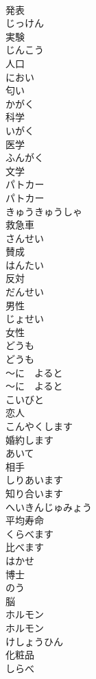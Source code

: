\documentclass[8pt]{extreport}
\begin{document}
\begin{CJK}{UTF8}{min}
\\	発表	
\\	じっけん	
\\	実験	
\\	じんこう	
\\	人口	
\\	におい	
\\	匂い	
\\	かがく	
\\	科学	
\\	いがく	
\\	医学		
\\	ふんがく	
\\	文学		
\\	パトカー	
\\	パトカー	
\\	きゅうきゅうしゃ	
\\	救急車	
\\	さんせい	
\\	賛成	
\\	はんたい	
\\	反対	
\\	だんせい	
\\	男性		
\\	じょせい	
\\	女性		
\\	どうも	
\\	どうも		
\\	〜に　よると	
\\	〜に　よると		
\\	こいびと	
\\	恋人		
\\	こんやくします	
\\	婚約します		
\\	あいて	
\\	相手		
\\	しりあいます	
\\	知り合います		
\\	へいきんじゅみょう	
\\	平均寿命		
\\	くらべます	
\\	比べます		
\\	はかせ	
\\	博士		
\\	のう	
\\	脳		
\\	ホルモン	
\\	ホルモン		
\\	けしょうひん	
\\	化粧品		
\\	しらべ	

\end{CJK}
\end{document}
